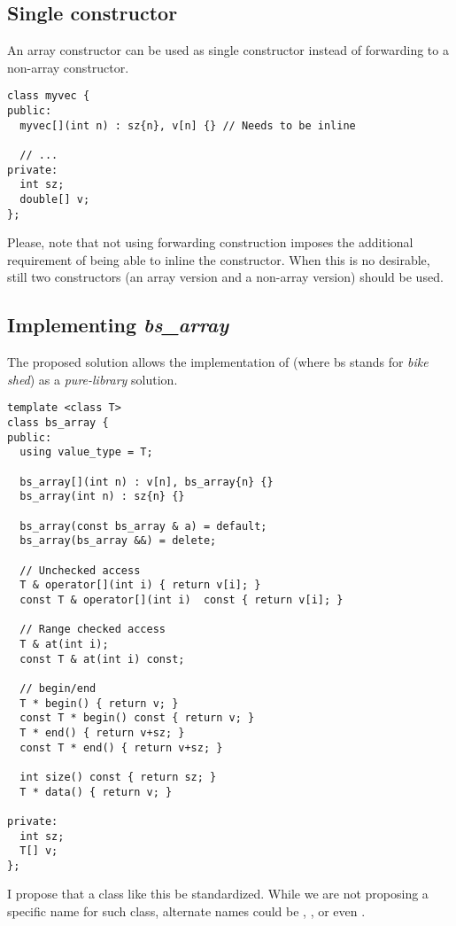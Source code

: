 \subsection{Single constructor}

An array constructor can be used as single constructor instead of forwarding to a
non-array constructor.

\begin{lstlisting}
class myvec {
public:
  myvec[](int n) : sz{n}, v[n] {} // Needs to be inline

  // ...
private:
  int sz;
  double[] v;
};
\end{lstlisting}

Please, note that not using forwarding construction imposes the additional requirement
of being able to inline the constructor. When this is no desirable, still two constructors
(an array version and a non-array version) should be used.



\subsection{Implementing \emph{bs\_array}}

The proposed solution allows the implementation of 
(where bs stands for \emph{bike shed}) as a \emph{pure-library} solution.

\begin{lstlisting}
template <class T>
class bs_array {
public:
  using value_type = T;

  bs_array[](int n) : v[n], bs_array{n} {}
  bs_array(int n) : sz{n} {}

  bs_array(const bs_array & a) = default;
  bs_array(bs_array &&) = delete;

  // Unchecked access
  T & operator[](int i) { return v[i]; }
  const T & operator[](int i)  const { return v[i]; }

  // Range checked access
  T & at(int i);
  const T & at(int i) const;

  // begin/end
  T * begin() { return v; }
  const T * begin() const { return v; }
  T * end() { return v+sz; }
  const T * end() { return v+sz; }

  int size() const { return sz; }
  T * data() { return v; }

private:
  int sz;
  T[] v;
};
\end{lstlisting}

I propose that a class like this be standardized. While we are not proposing a
specific name for such class, alternate names could be ,
,  or even .

